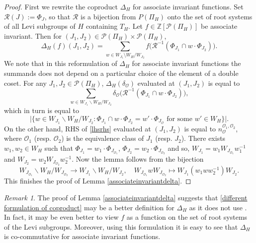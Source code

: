 \documentclass{amsart}
\theoremstyle{plain}
\theoremstyle{definition}
\theoremstyle{remark}
\newtheorem{remark}{Remark}[section]
\begin{document}
\begin{proof}
First we rewrite the coproduct $\Delta_{H}$ for associate invariant functions. Set $\mathcal{R}(J):=\Phi_{J}$, so that $\mathcal{R}$ is a bijection from $P(\Pi_{H})$ onto the set of root systems of all Levi subgroups of $H$ containing $T_H$. Let $f\in\mathbb{Z}[\mathcal{P}(\Pi_{H})]$ be associate invariant. Then for $(J_{1},J_{2})\in\mathcal{P}(\Pi_{H})\times\mathcal{P}(\Pi_{H})$,
\begin{equation}\label{different formulation of coproduct}
    \Delta_{H} (f)(J_1,J_2)=\sum_{w\in W_{J_1}\setminus W_{H}/W_{J_2}}f\big(\mathcal{R}^{-1}(\Phi_{J_{1}}\cap w\cdot\Phi_{J_{2}})\big).
\end{equation}
We note that in this reformulation of $\Delta_{H}$ for associate invariant functions the summands does not depend on a particular choice of the element of a double coset.
For any $J_{1}, J_{2}\in\mathcal{P}(\Pi_{H})$, $\Delta_{H}(\delta_{\mathcal{O}})$ evaluated at $(J_{1},J_{2})$ is equal to
\[
\sum_{w\in W_{J_{1}}\backslash W_{H}/W_{J_{2}}}\delta_{\mathcal{O}}\big(\mathcal{R}^{-1}(\Phi_{J_{1}}\cap w\cdot \Phi_{J_{2}})\big),
\]
which in turn is equal to
\[
\big|\{w\in W_{J_{1}}\backslash W_{H}/W_{J_{2}}:\Phi_{J_{1}}\cap w\cdot \Phi_{J_{2}}=w'\cdot\Phi_{J_{\mathcal{O}}}\text{ for some }w'\in W_H\}\big|.
\]
On the other hand, RHS of \eqref{lhsrhs} evaluated at $(J_{1},J_{2})$ is equal to $n^{\mathcal{O}_{1},\mathcal{O}_{2}}_{\mathcal{O}}$, where $\mathcal{O}_{1}$ (resp. $\mathcal{O}_2$) is the equivalence class of $J_{1}$ (resp. $J_{2}$). There exists $w_{1}, w_{2} \in W_{H}$ such that $\Phi_{J_{1}}=w_{1}\cdot \Phi_{J_{\mathcal{O}_{1}}}$, $\Phi_{J_{2}}=w_{2}\cdot \Phi_{J_{\mathcal{O}_{2}}}$ and so, $W_{J_1}=w_{1}W_{J_{\mathcal{O}_{1}}}w_{1}^{-1}$ and $W_{J_2}=w_{2}W_{J_{\mathcal{O}_{2}}}w_{2}^{-1}$.
Now the lemma follows from the bijection
\[
W_{J_{\mathcal{O}_{1}}}\backslash W_{H}/W_{J_{\mathcal{O}_{2}}}\rightarrow W_{J_{1}}\backslash W_{H}/W_{J_{2}}, \quad W_{J_{\mathcal{O}_{1}}}wW_{J_{\mathcal{O}_{2}}}\mapsto W_{J_{1}}(w_{1}ww_{2}^{-1})W_{J_{2}}.
\]
This finishes the proof of Lemma \ref{associateinvariantdelta}.
\end{proof}
\begin{remark}\label{cocommutative}
  The proof of Lemma \ref{associateinvariantdelta} suggests that \eqref{different formulation of coproduct} may be a better definition for $\Delta_{H}$ as it does not use \cite[Proposition 2.7.3]{Car}. In fact, it may be even better to view $f$ as a function on the set of root systems of the Levi subgroups. Moreover, using this formulation it is easy to see that $\Delta_{H}$ is co-commutative for associate invariant functions.
\end{remark}
\end{document}
